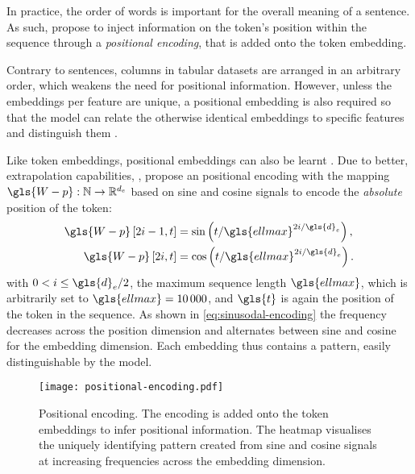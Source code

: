 In practice, the order of words is important for the overall meaning of a sentence. As such, \textcite[][6]{vaswaniAttentionAllYou2017} propose to inject information on the \gls{token}'s position within the sequence through a \emph{positional encoding}, that is added onto the \gls{token} embedding.

Contrary to sentences, columns in tabular datasets are arranged in an arbitrary order, which weakens the need for positional information. However, unless the embeddings per feature are unique, a positional embedding is also required so that the model can relate the otherwise identical embeddings to specific features and distinguish them \autocites[][3]{huangTabTransformerTabularData2020}[][15]{somepalliSaintImprovedNeural2021}.

Like \gls{token} embeddings, positional embeddings can also be learnt \autocite[cp.][4174]{devlinBERTPretrainingDeep2019}. Due to better, extrapolation capabilities, \textcite[][6]{vaswaniAttentionAllYou2017}, propose an positional encoding with the mapping $\gls{W-p}: \mathbb{N} \rightarrow \mathbb{R}^{d_{e}}$ based on sine and cosine signals to encode the \emph{absolute} position of the \gls{token}:
\begin{equation}
    \begin{aligned}
        \gls{W-p}\left[2 i-1, t\right] & =\sin \left(t / \gls{ellmax}^{2 i / \gls{d}_e}\right), \\
        \gls{W-p}\left[2 i, t\right]   & =\cos \left(t / \gls{ellmax}^{2 i / \gls{d}_e}\right).
    \end{aligned}
    \label{eq:sinusodal-encoding}
\end{equation}
with $0<i \leq \gls{d}_{e} / 2$, the maximum sequence length $\gls{ellmax}$, which is arbitrarily set to $\gls{ellmax}=\num{10000}$, and $\gls{t}$ is again the position of the \gls{token} in the sequence. As shown in \cref{eq:sinusodal-encoding} the frequency decreases across the position dimension and alternates between sine and cosine for the embedding dimension. Each embedding thus contains a pattern, easily distinguishable by the model.

\begin{figure}[ht]
    \centering
    \texttt{[image: positional-encoding.pdf]}
    \caption[Positional Encoding of Transformer]{Positional encoding. The encoding is added onto the \gls{token} embeddings to infer positional information. The heatmap visualises the uniquely identifying pattern created from sine and cosine signals at increasing frequencies across the embedding dimension.}
    \label{fig:positional-embedding}
\end{figure}

